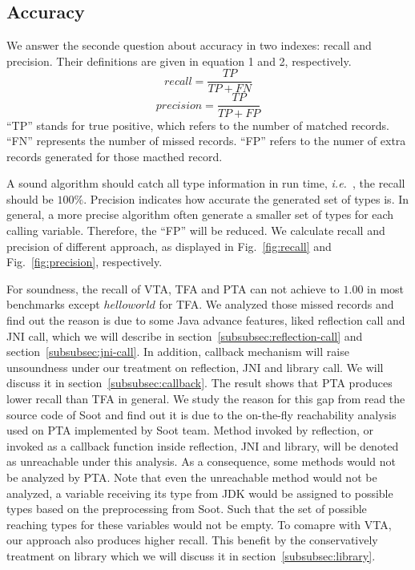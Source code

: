 \documentclass{fac}
\newcommand\ie{\textit{i.e.\ }}
\begin{document}
\subsection{Accuracy}\label{subsec:accuracy}
We answer the seconde question about accuracy in two indexes: recall and precision. Their definitions are given in equation 1 and 2, respectively.
\begin{equation}
recall = \dfrac{TP}{TP+FN}
\end{equation}
\begin{equation}
precision =  \dfrac{TP}{TP+FP}
\end{equation}
``TP'' stands for true positive, which refers to the number of matched records. ``FN'' represents the number of missed records. ``FP'' refers to the numer of extra records generated for those macthed record.

A sound algorithm should catch all type information in run time, \ie, the recall should be $100\%$. Precision indicates how accurate the generated set of types is. In general, a more precise algorithm often generate a smaller set of types for each calling variable. Therefore, the ``FP'' will be reduced. We calculate recall and precision of different approach, as displayed in Fig.~\ref{fig:recall} and Fig.~\ref{fig:precision}, respectively.

For soundness, the recall of VTA, TFA and PTA can not achieve to $1.00$ in most benchmarks except $helloworld$ for TFA. We analyzed those missed records and find out the reason is due to some Java advance features, liked reflection call and JNI call, which we will describe in section~\ref{subsubsec:reflection-call} and section~\ref{subsubsec:jni-call}. In addition, callback mechanism will raise unsoundness under our treatment on reflection, JNI and library call. We will discuss it in section~\ref{subsubsec:callback}. The result shows that PTA produces lower recall than TFA in general. We study the reason for this gap from read the source code of Soot and find out it is due to the on-the-fly reachability analysis used on PTA implemented by Soot team. Method invoked by reflection, or invoked as a callback function inside reflection, JNI and library, will be denoted as unreachable under this analysis. As a consequence, some methods would not be analyzed by PTA. Note that even the unreachable method would not be analyzed, a variable receiving its type from JDK would be assigned to possible types based on the preprocessing from Soot. Such that the set of possible reaching types for these variables would not be empty. To comapre with VTA, our approach also produces higher recall. This benefit by the conservatively treatment on library which we will discuss it in section~\ref{subsubsec:library}.
\end{document}
